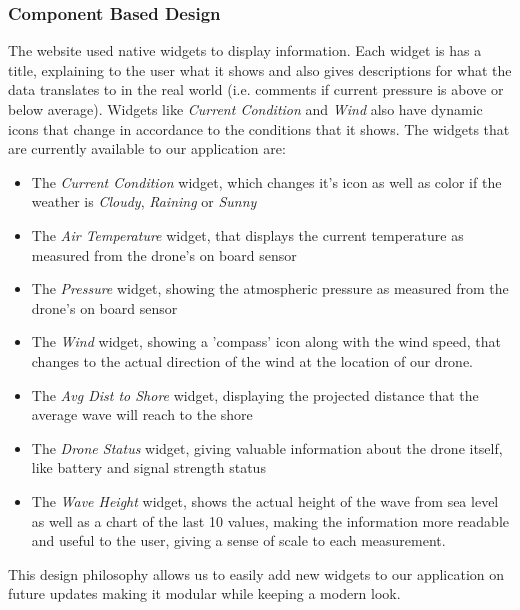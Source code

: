 \documentclass{article}
\begin{document}
    \subsubsection{Component Based Design}
    The website used native widgets to display information. Each widget is has a title, explaining to the user what it shows and also gives descriptions for what the data translates to in the real world (i.e. comments if current pressure is above or below average). Widgets like \textit{Current Condition} and \textit{Wind} also have dynamic icons that change in accordance to the conditions that it shows. The widgets that are currently available to our application are:
    \begin{itemize}
        \item The \textit{Current Condition} widget, which changes it's icon as well as color if the weather is \textit{Cloudy}, \textit{Raining} or \textit{Sunny}
        \item The \textit{Air Temperature} widget, that displays the current temperature as measured from the drone's on board sensor
        \item The \textit{Pressure} widget, showing the atmospheric pressure as measured from the drone's on board sensor
        \item The \textit{Wind} widget, showing a 'compass' icon along with the wind speed, that changes to the actual direction of the wind at the location of our drone.
        \item The \textit{Avg Dist to Shore} widget, displaying the projected distance that the average wave will reach to the shore
        \item The \textit{Drone Status} widget, giving valuable information about the drone itself, like battery and signal strength status
        \item The \textit{Wave Height} widget, shows the actual height of the wave from sea level as well as a chart of the last 10 values, making the information more readable and useful to the user, giving a sense of scale to each measurement.
    \end{itemize}
    This design philosophy allows us to easily add new widgets to our application on future updates making it modular while keeping a modern look.
\end{document}
